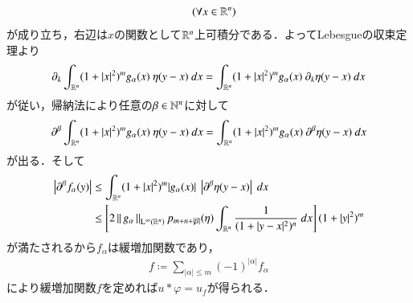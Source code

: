 \begin{prf}
\begin{description}
\begin{align}
				\quad (\forall x \in \mathbb{R}^n)
			\end{align}
			が成り立ち，右辺は$x$の関数として$\mathbb{R}^n$上可積分である．よってLebesgueの収束定理より
			\begin{align}
				\partial_k \int_{\R^n} (1+|x|^2)^m g_\alpha(x)\ \eta(y-x)\ dx
				= \int_{\R^n} (1+|x|^2)^m g_\alpha(x)\ \partial_k \eta(y-x)\ dx
			\end{align}
			が従い，帰納法により任意の$\beta \in \mathbb{N}^n$に対して
			\begin{align}
				\partial^\beta \int_{\R^n} (1+|x|^2)^m g_\alpha(x)\ \eta(y-x)\ dx
				= \int_{\R^n} (1+|x|^2)^m g_\alpha(x)\ \partial^\beta \eta(y-x)\ dx
			\end{align}
			が出る．そして
			\begin{align}
				\left| \partial^\beta f_\alpha(y) \right|
				&\leq \int_{\mathbb{R}^n} (1+|x|^2)^m |g_\alpha(x)|\ \left| \partial^\beta \eta(y-x) \right|\ dx \\
				&\leq \left[2 \left\|\, g_\alpha\, \right\|_{\mathrm{L}^\infty(\mathbb{R}^n)} p_{m+n+|\beta|}(\eta) \int_{\mathbb{R}^n} \frac{1}{(1+|y-x|^2)^n}\ dx \right] (1+|y|^2)^m
			\end{align}
			が満たされるから$f_\alpha$は緩増加関数であり，
			\begin{align}
				f \coloneqq \sum_{|\alpha| \leq m} (-1)^{|\alpha|} f_\alpha
			\end{align}
			により緩増加関数$f$を定めれば$u \ast \varphi = u_f$が得られる．
			\QED
		\end{description}
	\end{prf}